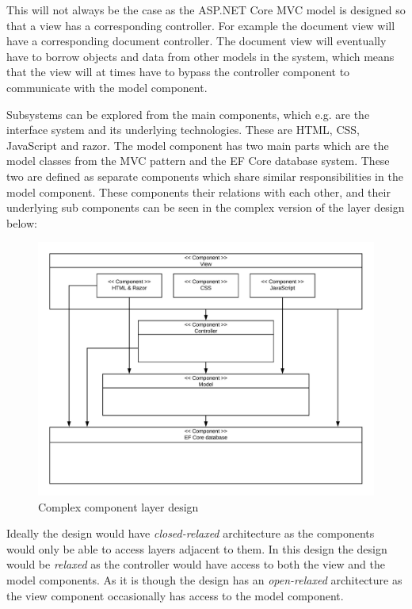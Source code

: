 This will not always be the case as the ASP.NET Core MVC model is designed so that a view has a corresponding controller.
For example the document view will have a corresponding document controller.
The document view will eventually have to borrow objects and data from other models in the system, which means that the view will at times have to bypass the controller component to communicate with the model component.

Subsystems can be explored from the main components, which e.g. are the interface system and its underlying technologies.
These are HTML, CSS, JavaScript and razor.
The model component has two main parts which are the model classes from the MVC pattern and the EF Core database system.
These two are defined as separate components which share similar responsibilities in the model component.
These components their relations with each other, and their underlying sub components can be seen in the complex version of the layer design below:

\begin{figure}[H]
	\centering
	\includegraphics[width=1\textwidth]{billeder/complexcomponents.jpeg}
	\caption{Complex component layer design}
\end{figure}

Ideally the design would have \textit{closed-relaxed} architecture as the components would only be able to access layers adjacent to them.
In this design the design would be \textit{relaxed} as the controller would have access to both the view and the model components.
As it is though the design has an \textit{open-relaxed} architecture as the view component occasionally has access to the model component.

